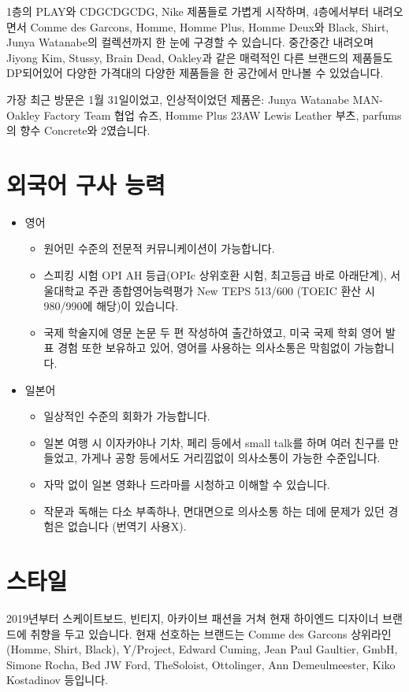 1층의 PLAY와 CDGCDGCDG, Nike 제품들로 가볍게 시작하며, 4층에서부터 내려오면서 Comme des Garcons, Homme, Homme Plus, Homme Deux와 Black, Shirt, Junya Watanabe의 컬렉션까지 한 눈에 구경할 수 있습니다. 중간중간 내려오며 Jiyong Kim, Stussy, Brain Dead, Oakley과 같은 매력적인 다른 브랜드의 제품들도 DP되어있어 다양한 가격대의 다양한 제품들을 한 공간에서 만나볼 수 있었습니다.

가장 최근 방문은 1월 31일이었고, 인상적이었던 제품은: Junya Watanabe MAN-Oakley Factory Team 협업 슈즈, Homme Plus 23AW Lewis Leather 부츠, parfums의 향수 Concrete와 2였습니다.

\section*{외국어 구사 능력}
\begin{itemize}
    \item 영어
          \begin{itemize}
              \item 원어민 수준의 전문적 커뮤니케이션이 가능합니다.
              \item 스피킹 시험 OPI AH 등급(OPIc 상위호환 시험, 최고등급 바로 아래단계), 서울대학교 주관 종합영어능력평가 New TEPS 513/600 (TOEIC 환산 시 980/990에 해당)이 있습니다.
              \item 국제 학술지에 영문 논문 두 편 작성하여 출간하였고, 미국 국제 학회 영어 발표 경험 또한 보유하고 있어, 영어를 사용하는 의사소통은 막힘없이 가능합니다.
          \end{itemize}
    \item 일본어
          \begin{itemize}
              \item 일상적인 수준의 회화가 가능합니다.
              \item 일본 여행 시 이자카야나 기차, 페리 등에서 small talk를 하며 여러 친구를 만들었고, 가게나 공항 등에서도 거리낌없이 의사소통이 가능한 수준입니다.
              \item 자막 없이 일본 영화나 드라마를 시청하고 이해할 수 있습니다.
              \item 작문과 독해는 다소 부족하나, 면대면으로 의사소통 하는 데에 문제가 있던 경험은 없습니다 (번역기 사용X).
          \end{itemize}
\end{itemize}

\section*{스타일}
2019년부터 스케이트보드, 빈티지, 아카이브 패션을 거쳐 현재 하이엔드 디자이너 브랜드에 취향을 두고 있습니다.
현재 선호하는 브랜드는 Comme des Garcons 상위라인(Homme, Shirt, Black), Y/Project, Edward Cuming, Jean Paul Gaultier, GmbH, Simone Rocha, Bed JW Ford, TheSoloist, Ottolinger, Ann Demeulmeester, Kiko Kostadinov 등입니다.

